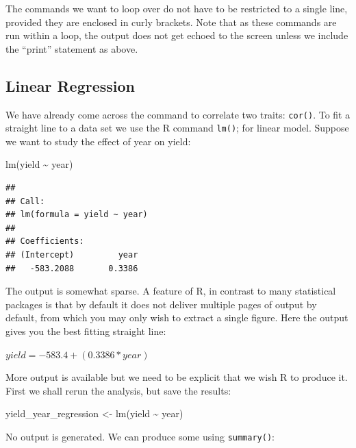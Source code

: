 \documentclass[
]{book}
\newenvironment{Shaded}{\begin{snugshade}}{\end{snugshade}}
\newcommand{\FunctionTok}[1]{\textcolor[rgb]{0.00,0.00,0.00}{#1}}
\newcommand{\NormalTok}[1]{#1}
\newcommand{\OtherTok}[1]{\textcolor[rgb]{0.56,0.35,0.01}{#1}}
\newcommand{\SpecialCharTok}[1]{\textcolor[rgb]{0.00,0.00,0.00}{#1}}
\begin{document}
The commands we want to loop over do not have to be restricted to a single line, provided they are enclosed in curly brackets. Note that as these commands are run within a loop, the output does not get echoed to the screen unless we include the ``print'' statement as above.

\hypertarget{linear-regression}{%
\subsection{Linear Regression}\label{linear-regression}}

We have already come across the command to correlate two traits: \texttt{cor()}. To fit a straight line to a data set we use the R command \texttt{lm()}; for linear model. Suppose we want to study the effect of year on yield:

\begin{Shaded}
\begin{Highlighting}[]
\FunctionTok{lm}\NormalTok{(yield }\SpecialCharTok{\textasciitilde{}}\NormalTok{ year)}
\end{Highlighting}
\end{Shaded}

\begin{verbatim}
## 
## Call:
## lm(formula = yield ~ year)
## 
## Coefficients:
## (Intercept)         year  
##   -583.2088       0.3386
\end{verbatim}

The output is somewhat sparse. A feature of R, in contrast to many statistical packages is that by default it does not deliver multiple pages of output by default, from which you may only wish to extract a single figure. Here the output gives you the best fitting straight line:

\(yield = -583.4 + (0.3386 * year)\)

More output is available but we need to be explicit that we wish R to produce it. First we shall rerun the analysis, but save the results:

\begin{Shaded}
\begin{Highlighting}[]
\NormalTok{yield\_year\_regression }\OtherTok{\textless{}{-}} \FunctionTok{lm}\NormalTok{(yield }\SpecialCharTok{\textasciitilde{}}\NormalTok{ year)}
\end{Highlighting}
\end{Shaded}

No output is generated. We can produce some using \texttt{summary()}:
\end{document}
